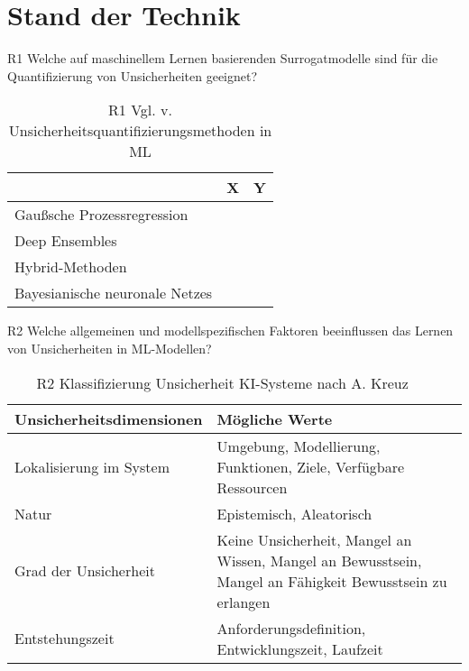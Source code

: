 
\chapter{Stand der Technik}
\label{chapter:stand-der-technik}

R1 Welche auf maschinellem Lernen basierenden Surrogatmodelle sind für die Quantifizierung von Unsicherheiten geeignet?

\begin{table}[htpb]
  \centering
  \begin{tabular}{|l|l|p{\dimexpr\textwidth-8cm-2\tabcolsep}|}  %
    \hline
    & \textbf{X} & \textbf{Y} \\
    \hline
    \gls{Gaußsche Prozessregression} & & \\
    \hline
    Deep Ensembles & & \\
    \hline
    Hybrid-Methoden & & \\
    \hline
    \gls{Bayesianische neuronale Netze}s & & \\
    \hline
  \end{tabular}
  \caption{R1 Vgl. v. Unsicherheitsquantifizierungsmethoden in ML}\label{tab:chapter6r1}
\end{table}

R2 Welche allgemeinen und modellspezifischen Faktoren beeinflussen das Lernen von Unsicherheiten in ML-Modellen?

\begin{table}[htpb]
  \begin{tabular}{|l|p{10cm}|}
    \hline
    \textbf{Unsicherheitsdimensionen} & \textbf{Mögliche Werte} \\
    \hline
    Lokalisierung im System & Umgebung, Modellierung, Funktionen, Ziele, Verfügbare Ressourcen \\
    \hline
    Natur & Epistemisch, Aleatorisch \\
    \hline
    Grad der Unsicherheit & Keine Unsicherheit, Mangel an Wissen, Mangel an Bewusstsein, Mangel an Fähigkeit Bewusstsein zu erlangen \\
    \hline
    Entstehungszeit & Anforderungsdefinition, Entwicklungszeit, Laufzeit \\
    \hline
  \end{tabular}
  \caption{R2 Klassifizierung Unsicherheit KI-Systeme nach A. Kreuz ~\nocite{AndreasKreutz2022} ~\nocite{AndreasKreutz2022b}}\label{tab:uqclass}
\end{table}

